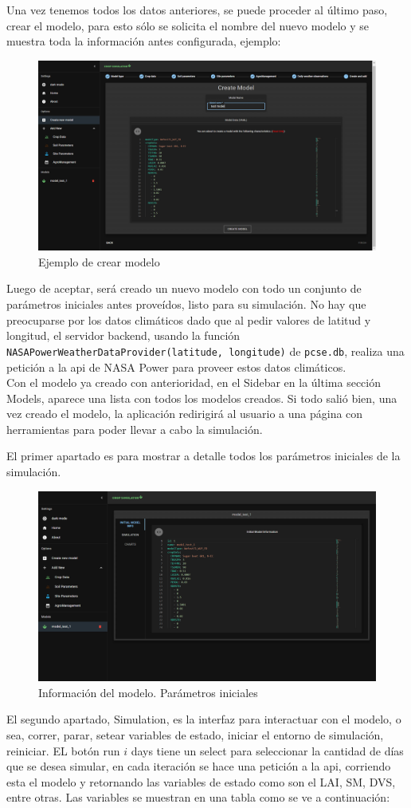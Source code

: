 Una vez tenemos todos los datos anteriores, se puede proceder al último paso, crear el modelo, para esto sólo se solicita el nombre del nuevo modelo y se muestra toda la información antes configurada, ejemplo:

\begin{figure}[!h]
	\centering
	\includegraphics[width=0.5\linewidth]{Images/create-model}
	\caption{Ejemplo de crear modelo}
	\label{fig:create-model}
\end{figure}

Luego de aceptar, será creado un nuevo modelo con todo un conjunto de parámetros iniciales antes proveídos, listo para su simulación. No hay que preocuparse por los datos climáticos dado que al pedir valores de latitud y longitud, el servidor backend, usando la función \lstinline|NASAPowerWeatherDataProvider(latitude, longitude)| de \lstinline|pcse.db|, realiza una petición a la api de NASA Power para proveer estos datos climáticos.\\

Con el modelo ya creado con anterioridad, en el Sidebar en la última sección Models, aparece una lista con todos los modelos creados. Si todo salió bien, una vez creado el modelo, la aplicación redirigirá al usuario a una página con herramientas para poder llevar a cabo la simulación.

El primer apartado es para mostrar a detalle todos los parámetros iniciales de la simulación.
\begin{figure}[!h]
	\centering
	\includegraphics[width=0.5\linewidth]{Images/sim-1}
	\caption{Información del modelo. Parámetros iniciales}
	\label{fig:sim-1}
\end{figure}

El segundo apartado, Simulation, es la interfaz para interactuar con el modelo, o sea, correr, parar, setear variables de estado, iniciar el entorno de simulación, reiniciar. EL botón run $ i $ days tiene un select para seleccionar la cantidad de días que se desea simular, en cada iteración se hace una petición a la api, corriendo esta el modelo y retornando las variables de estado como son el LAI, SM, DVS, entre otras. Las variables se muestran en una tabla como se ve a continuación:

